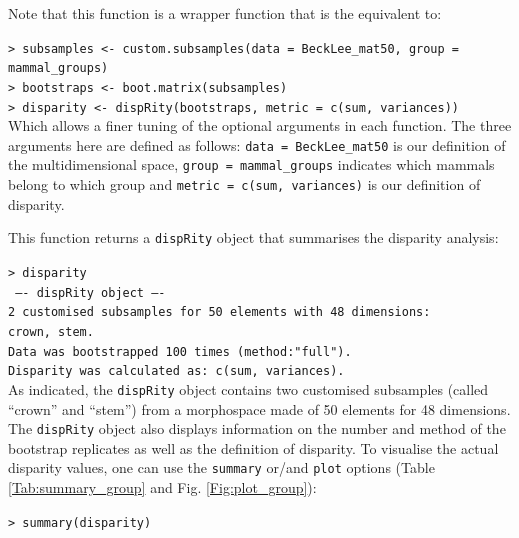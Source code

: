 \documentclass[12pt,letterpaper]{article}
\newcommand{\disp}{\texttt{dispRity} }
\begin{document}
\noindent Note that this function is a wrapper function that is the equivalent to:

\noindent \texttt{> subsamples <- custom.subsamples(data = BeckLee\_mat50, group = mammal\_groups)}\\
\noindent \texttt{> bootstraps <- boot.matrix(subsamples)}\\
\noindent \texttt{> disparity <- dispRity(bootstraps, metric = c(sum, variances))}\\

\noindent Which allows a finer tuning of the optional arguments in each function.
The three arguments here are defined as follows: \texttt{data = BeckLee\_mat50} is our definition of the multidimensional space, \texttt{group = mammal\_groups} indicates which mammals belong to which group and \texttt{metric = c(sum, variances)} is our definition of disparity. 

This function returns a \disp object that summarises the disparity analysis:

\noindent \texttt{> disparity}\\
\noindent \texttt{ ---- dispRity object ---- }\\
\noindent \texttt{2 customised subsamples for 50 elements with 48 dimensions:}\\
          \texttt{crown, stem.}\\
\noindent \texttt{Data was bootstrapped 100 times (method:"full").}\\
\noindent \texttt{Disparity was calculated as: c(sum, variances).}\\

\bigskip
As indicated, the \disp object contains two customised subsamples (called ``crown'' and ``stem'') from a morphospace made of 50 elements for 48 dimensions.
The \disp object also displays information on the number and method of the bootstrap replicates as well as the definition of disparity.
To visualise the actual disparity values, one can use the \texttt{summary} or/and \texttt{plot} options (Table \ref{Tab:summary_group} and Fig. \ref{Fig:plot_group}):



\noindent \texttt{> summary(disparity)}
\end{document}
